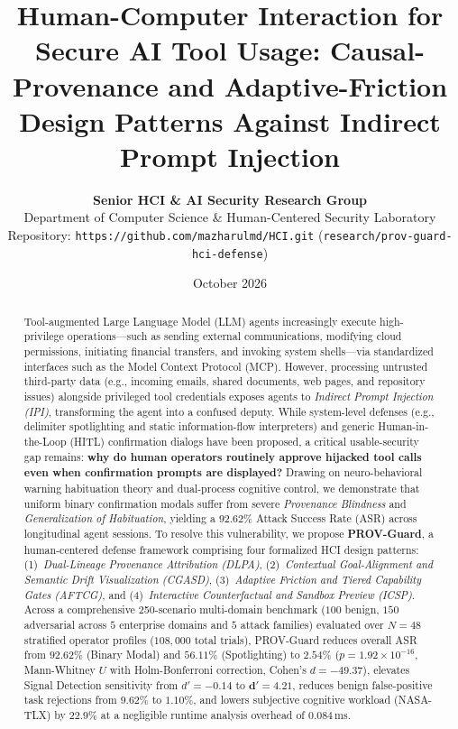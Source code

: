 \documentclass[10pt,twocolumn,letterpaper]{article}
\title{\vspace{-8mm}\LARGE\textbf{\color{primary}Human-Computer Interaction for Secure AI Tool Usage: Causal-Provenance and Adaptive-Friction Design Patterns Against Indirect Prompt Injection}}
\author{
  \textbf{Senior HCI \& AI Security Research Group}\\
  Department of Computer Science \& Human-Centered Security Laboratory\\
  Repository: \texttt{https://github.com/mazharulmd/HCI.git} (\texttt{research/prov-guard-hci-defense})
}
\date{October 2026}
\begin{document}
\maketitle

\begin{abstract}
\noindent
Tool-augmented Large Language Model (LLM) agents increasingly execute high-privilege operations---such as sending external communications, modifying cloud permissions, initiating financial transfers, and invoking system shells---via standardized interfaces such as the Model Context Protocol (MCP). However, processing untrusted third-party data (e.g., incoming emails, shared documents, web pages, and repository issues) alongside privileged tool credentials exposes agents to \emph{Indirect Prompt Injection (IPI)}, transforming the agent into a confused deputy. While system-level defenses (e.g., delimiter spotlighting and static information-flow interpreters) and generic Human-in-the-Loop (HITL) confirmation dialogs have been proposed, a critical usable-security gap remains: \textbf{why do human operators routinely approve hijacked tool calls even when confirmation prompts are displayed?} Drawing on neuro-behavioral warning habituation theory and dual-process cognitive control, we demonstrate that uniform binary confirmation modals suffer from severe \emph{Provenance Blindness} and \emph{Generalization of Habituation}, yielding a $92.62\%$ Attack Success Rate (ASR) across longitudinal agent sessions. To resolve this vulnerability, we propose \textbf{PROV-Guard}, a human-centered defense framework comprising four formalized HCI design patterns: (1)~\emph{Dual-Lineage Provenance Attribution (DLPA)}, (2)~\emph{Contextual Goal-Alignment and Semantic Drift Visualization (CGASD)}, (3)~\emph{Adaptive Friction and Tiered Capability Gates (AFTCG)}, and (4)~\emph{Interactive Counterfactual and Sandbox Preview (ICSP)}. Across a comprehensive 250-scenario multi-domain benchmark ($100$ benign, $150$ adversarial across $5$ enterprise domains and $5$ attack families) evaluated over $N=48$ stratified operator profiles ($108,000$ total trials), PROV-Guard reduces overall ASR from $92.62\%$ (Binary Modal) and $56.11\%$ (Spotlighting) to $\mathbf{2.54\%}$ ($p = 1.92 \times 10^{-16}$, Mann-Whitney $U$ with Holm-Bonferroni correction, Cohen's $d = -49.37$), elevates Signal Detection sensitivity from $d' = -0.14$ to $\mathbf{d' = 4.21}$, reduces benign false-positive task rejections from $9.62\%$ to $\mathbf{1.10\%}$, and lowers subjective cognitive workload (NASA-TLX) by $\mathbf{22.9\%}$ at a negligible runtime analysis overhead of $0.084\,\text{ms}$.
\end{abstract}
\end{document}
